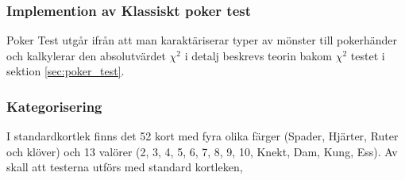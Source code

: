 \documentclass[swedish,a4paper]{article}
\begin{document}
\subsubsection{Implemention av Klassiskt poker test}
Poker Test utgår ifrån att man karaktäriserar typer av mönster till 
pokerhänder och kalkylerar  den absolutvärdet $\chi^2$ i detalj beskrevs
teorin bakom $\chi^2$ testet i sektion
\ref{sec:poker_test}. 

\subsubsection*{Kategorisering}
I standardkortlek finns det 52 kort med fyra olika 
färger (Spader, Hjärter, Ruter och klöver) och 13 valörer 
(2, 3, 4, 5, 6, 7, 8, 9, 10, Knekt, Dam, Kung, Ess).
Av skall att testerna utförs med standard kortleken,
\end{document}
